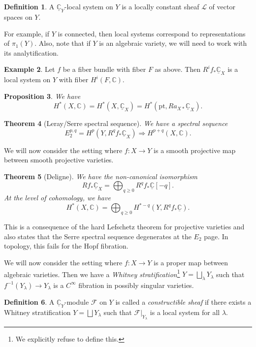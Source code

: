 \documentclass{amsart}
\newtheorem{thm}{Theorem}[section]
\newtheorem{prop}[thm]{Proposition}
\theoremstyle{definition}
\newtheorem{defn}[thm]{Definition}
\newtheorem{exm}[thm]{Example}
\theoremstyle{remark}
\theoremstyle{plain}
\theoremstyle{definition}
\theoremstyle{remark}
\newcommand{\C}{\mathbb{C}}
\newcommand{\mc}[1]{\mathcal{#1}}
\newcommand{\mr}[1]{\mathrm{#1}}
\newcommand{\ul}[1]{\underline{#1}}
\newcommand{\1}{\mathbf{1}}
\newcommand{\2}{\mathbf{2}}
\newcommand{\3}{\mathbf{3}}
\begin{document}
\begin{defn}
    A \(\ul{\C}_Y\)-local system on \(Y\) is a locally constant sheaf \(\mc{L}\) of vector spaces on \(Y\).
\end{defn}

For example, if \(Y\) is connected, then local systems correspond to representations of \(\pi_1(Y)\). Also, note that if \(Y\) is an algebraic variety, we will need to work with its analytification.

\begin{exm}
    Let \(f\) be a fiber bundle with fiber \(F\) as above. Then \(R^i f_* \ul{\C}_X\) is a local system on \(Y\) with fiber \(H^i(F, \C)\).
\end{exm}

\begin{prop}
    We have
    \[ H^*(X, \C) = H^*(X, \ul{\C}_X) = H^*(\mr{pt}, R a_{X*} \ul{\C}_X). \]
\end{prop}

\begin{thm}[Leray/Serre spectral sequence]
    We have a spectral sequence
    \[ E_2^{p,q} = H^p(Y, R^q f_* \ul{\C}_X) \Rightarrow H^{p+q}(X, \C). \]
\end{thm}

We will now consider the setting where \(f \colon X \to Y\) is a smooth projective map between smooth projective varieties.

\begin{thm}[Deligne]
    We have the non-canonical isomorphism
    \[ R f_* \ul{\C}_X = \bigoplus_{q \geq 0} R^q f_* \ul{\C}[-q]. \]
    At the level of cohomology, we have
    \[ H^*(X, \C) = \bigoplus_{q \geq 0} H^{*-q}(Y, R^q f_* \ul{\C}). \]
\end{thm}

This is a consequence of the hard Lefschetz theorem for projective varieties and also states that the Serre spectral sequence degenerates at the \(E_2\) page. In topology, this fails for the Hopf fibration.

We will now consider the setting where \(f \colon X \to Y\) is a proper map between algebraic varieties. Then we have a \textit{Whitney stratification}\footnote{We explicitly refuse to define this.} \(Y = \bigsqcup_{\lambda} Y_{\lambda}\) such that \(f^{-1}(Y_{\lambda}) \to Y_{\lambda}\) is a \(C^{\infty}\) fibration in possibly singular varieties.

\begin{defn}
    A \(\ul{\C}_Y\)-module \(\mc{F}\) on \(Y\) is called a \textit{constructible sheaf} if there exists a Whitney stratification \(Y = \bigsqcup Y_{\lambda}\) such that \(\mc{F}|_{Y_{\lambda}}\) is a local system for all \(\lambda\).
\end{defn}
\end{document}
